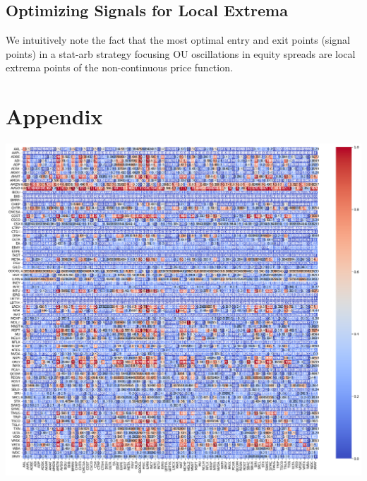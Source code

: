 \documentclass{article}
\begin{document}
\begin{spacing}{2.0}
\subsection{Optimizing Signals for Local Extrema}

We intuitively note the fact that the most optimal entry and exit points (signal points) in a stat-arb strategy focusing OU oscillations in equity spreads are local extrema points of
the non-continuous price function.

\newpage

\section{Appendix}

\begin{center}
    \includegraphics[scale=0.40]{./images/full_cointegration_heatmap.png}
\end{center}




\end{spacing}
\end{document}
